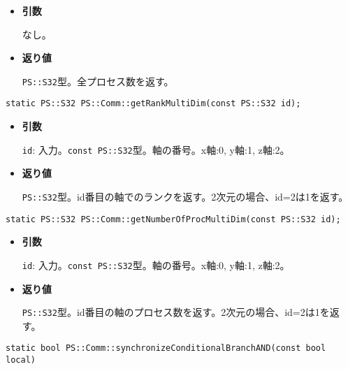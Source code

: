 \begin{itemize}

\item{{\bf 引数}}

なし。

\item{{\bf 返り値}}

{\tt PS::S32}型。全プロセス数を返す。

\end{itemize}

\begin{screen}
\begin{verbatim}
static PS::S32 PS::Comm::getRankMultiDim(const PS::S32 id);
\end{verbatim}
\end{screen}

\begin{itemize}

\item{{\bf 引数}}

{\tt id}: 入力。{\tt const PS::S32}型。軸の番号。x軸:0, y軸:1, z軸:2。

\item{{\bf 返り値}}

{\tt PS::S32}型。id番目の軸でのランクを返す。2次元の場合、id=2は1を返す。

\end{itemize}

\begin{screen}
\begin{verbatim}
static PS::S32 PS::Comm::getNumberOfProcMultiDim(const PS::S32 id);
\end{verbatim}
\end{screen}

\begin{itemize}

\item{{\bf 引数}}

{\tt id}: 入力。{\tt const PS::S32}型。軸の番号。x軸:0, y軸:1, z軸:2。

\item{{\bf 返り値}}

{\tt PS::S32}型。id番目の軸のプロセス数を返す。2次元の場合、id=2は1を返す。

\end{itemize}

\begin{screen}
\begin{verbatim}
static bool PS::Comm::synchronizeConditionalBranchAND(const bool local)
\end{verbatim}
\end{screen}

